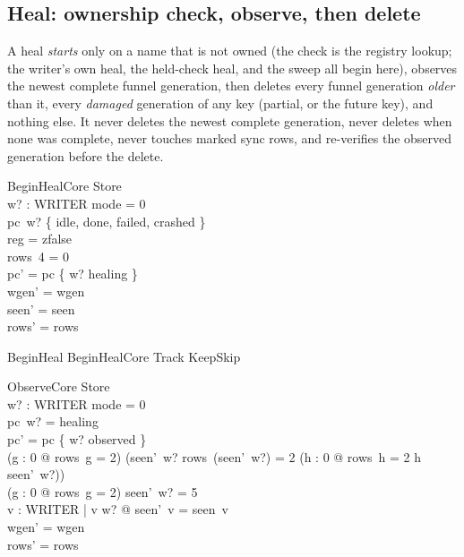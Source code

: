 \documentclass[a4paper,10pt,fleqn]{article}
\begin{document}
\subsection{Heal: ownership check, observe, then delete}

A heal \emph{starts} only on a name that is not owned (the check is the
registry lookup; the writer's own heal, the held-check heal, and the sweep all
begin here), observes the newest complete funnel generation, then deletes every
funnel generation \emph{older} than it, every \emph{damaged} generation of any
key (partial, or the future key), and nothing else. It never deletes the newest
complete generation, never deletes when none was complete, never touches marked
sync rows, and re-verifies the observed generation before the delete.

\begin{schema}{BeginHealCore}
\Delta Store \\ w? : WRITER
\where
mode = 0 \\
pc~w? \in \{ idle, done, failed, crashed \} \\
reg = zfalse \\
rows~4 = 0 \\
pc' = pc \oplus \{ w? \mapsto healing \} \\
wgen' = wgen \\
seen' = seen \\
rows' = rows
\end{schema}

\begin{zed}
BeginHeal  BeginHealCore \land Track \land KeepSkip
\end{zed}

\begin{schema}{ObserveCore}
\Delta Store \\ w? : WRITER
\where
mode = 0 \\
pc~w? = healing \\
pc' = pc \oplus \{ w? \mapsto observed \} \\
(\exists g : 0  @ rows~g = 2) \implies
  (seen'~w?  \land rows~(seen'~w?) = 2 \land
   (\forall h : 0  @ rows~h = 2 \implies h \leq seen'~w?)) \\
\lnot (\exists g : 0  @ rows~g = 2) \implies seen'~w? = 5 \\
\forall v : WRITER | v \neq w? @ seen'~v = seen~v \\
wgen' = wgen \\
rows' = rows
\end{schema}
\end{document}
